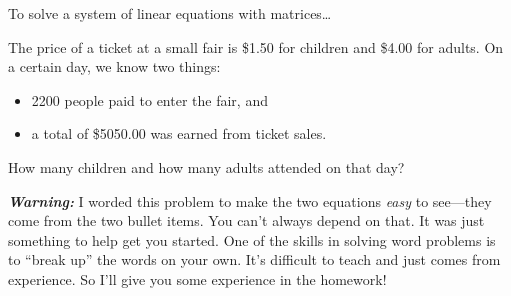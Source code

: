 

\begin{myConceptSteps}{
    To solve a system of linear equations with matrices\dots
}
\end{myConceptSteps}




\begin{myExample}{
    The price of a ticket at a small fair is 
    \$1.50 for children and 
    \$4.00 for adults. 
    On a certain day, we know two things:
    \begin{itemize}[itemsep=0in]
        \item 2200 people paid to enter the fair, and
        \item a total of \$5050.00 was earned from ticket sales.
    \end{itemize}  
    How many children and how many adults attended on that day?
        }
    \myWideMatrixTable
    \vspace{6em}
\end{myExample}

{\bfseries\itshape Warning:} I worded this problem to make the two equations {\itshape easy}
to see---they come from the two bullet items. You can't always depend on that.
It was just something to help get you started.
One of the skills in solving word problems is to ``break up'' the words on your own.
It's difficult to teach 
and just comes from experience.
So I'll give you some experience in the homework!

